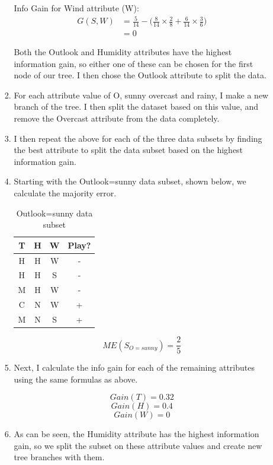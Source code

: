 \documentclass[12pt, fullpage,letterpaper]{article}
\begin{document}
\begin{enumerate}
\begin{enumerate}
\begin{enumerate}
			Info Gain for Wind attribute (W):
			\[
        		\begin{split}
        			G(S,W) &= \frac{5}{14} - \Big( \frac{8}{14}\times\frac{2}{8} + \frac{6}{14}\times \frac{3}{6} \Big)
        					\\
        					&= 0
        		\end{split}
			\]
			
			Both the Outlook and Humidity attributes have the highest information gain, so either one of these can be chosen for the first node of our tree. I then chose the Outlook attribute to split the data. 
		\item For each attribute value of O, sunny overcast and rainy, I make a new branch of the tree. I then split the dataset based on this value, and remove the Overcast attribute from the data completely.
		
		\item I then repeat the above for each of the three data subsets by finding the best attribute to split the data subset based on the highest information gain.
		
		\item Starting with the Outlook=sunny data subset, shown below, we calculate the majority error.
		
		\begin{table}[h]
		\centering
		\begin{tabular}{ccc|c}
			T & H & W & Play?\\ 
			\hline\hline
			H & H & W & -\\ \hline
			H & H & S & -\\ \hline
			M & H & W & -\\ \hline
			C & N & W & +\\ \hline
			M & N & S & +\\ \hline

		\end{tabular}
		\caption{Outlook=sunny data subset}
		\end{table}		
		
		\[
			ME(S_{O=sunny}) = \frac{2}{5}
		\]
		
		\item Next, I calculate the info gain for each of the remaining attributes using the same formulas as above.
		
		\[
			Gain(T) = 0.32
		\]
		\[
			Gain(H) = 0.4
		\]
		\[
			Gain(W) = 0
		\]
		
		\item As can be seen, the Humidity attribute has the highest information gain, so we split the subset on these attribute values and create new tree branches with them. 
		

\end{enumerate}
\end{enumerate}
\end{enumerate}
\end{document}

